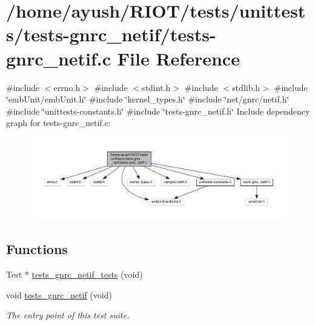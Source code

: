 \hypertarget{tests-gnrc__netif_8c}{}\section{/home/ayush/\+R\+I\+O\+T/tests/unittests/tests-\/gnrc\+\_\+netif/tests-\/gnrc\+\_\+netif.c File Reference}
\label{tests-gnrc__netif_8c}
{\ttfamily \#include $<$errno.\+h$>$}\newline
{\ttfamily \#include $<$stdint.\+h$>$}\newline
{\ttfamily \#include $<$stdlib.\+h$>$}\newline
{\ttfamily \#include \char`\"{}emb\+Unit/emb\+Unit.\+h\char`\"{}}\newline
{\ttfamily \#include \char`\"{}kernel\+\_\+types.\+h\char`\"{}}\newline
{\ttfamily \#include \char`\"{}net/gnrc/netif.\+h\char`\"{}}\newline
{\ttfamily \#include \char`\"{}unittests-\/constants.\+h\char`\"{}}\newline
{\ttfamily \#include \char`\"{}tests-\/gnrc\+\_\+netif.\+h\char`\"{}}\newline
Include dependency graph for tests-\/gnrc\+\_\+netif.c\+:
\nopagebreak
\begin{figure}[H]
\begin{center}
\leavevmode
\includegraphics[width=350pt]{tests-gnrc__netif_8c__incl}
\end{center}
\end{figure}
\subsection*{Functions}
\textbf{ }\par
\begin{DoxyCompactItemize}
\item 
Test $\ast$ \hyperlink{tests-gnrc__netif_8c_a56f48a394cafcdce886fa35034e9a6ae}{tests\+\_\+gnrc\+\_\+netif\+\_\+tests} (void)
\item 
void \hyperlink{group__unittests_gaa2175e6139cd4093cd5668926a58e869}{tests\+\_\+gnrc\+\_\+netif} (void)
\begin{DoxyCompactList}\small\item\em The entry point of this test suite. \end{DoxyCompactList}\end{DoxyCompactItemize}



